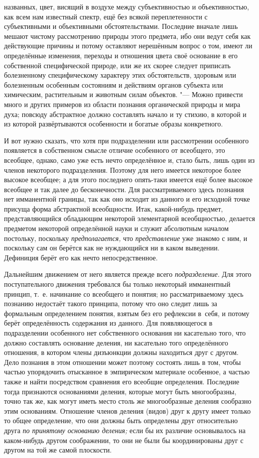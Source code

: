 названных, цвет, висящий в воздухе между субъективностью и объективностью,
как всем нам известный спектр, ещё без всякой переплетенности с
субъективными и объективными обстоятельствами. Последние вначале лишь
мешают чистому рассмотрению природы этого предмета, ибо они ведут себя как
действующие причины и потому оставляют нерешённым вопрос о том, имеют ли
определённые изменения, переходы и отношения цвета своё основание в его
собственной специфической природе, или же их скорее следует приписать
болезненному специфическому характеру этих обстоятельств, здоровым или
болезненным особенным состояниям и действиям органов субъекта или
химическим, растительным и животным силам объектов. "--- Можно
привести много и других примеров из области познания органической природы и
мира духа; повсюду абстрактное должно составлять начало и ту стихию, в
которой и из которой развёртываются особенности и богатые образы
конкретного.

И вот нужно сказать, что хотя при подразделении или
рассмотрении особенного появляется в собственном смысле отличие особенного
от всеобщего, это всеобщее, однако, само уже есть нечто определённое и,
стало быть, лишь один из членов некоторого подразделения. Поэтому для него
имеется некоторое более высокое всеобщее; а для этого последнего опять-таки
имеется ещё более высокое всеобщее и так далее до
бесконечности. Для рассматриваемого здесь познания нет имманентной границы,
так как оно исходит из данного и его исходной точке присуща форма
абстрактной всеобщности. Итак, какой-нибудь предмет, представляющийся
обладающим некоторой элементарной всеобщностью, делается предметом
некоторой определённой науки и служит абсолютным началом постольку,
поскольку {\em предполагается,}
что {\em представление}
уже знакомо с ним, и поскольку сам он берётся как не
нуждающийся ни в каком выведении. Дефиниция берёт его как нечто
непосредственное.

Дальнейшим движением от него является прежде всего
{\em подразделение}. Для
этого поступательного движения требовался бы только некоторый имманентный
принцип, т.~е. начинание со всеобщего и понятия; но рассматриваемому здесь
познанию недостаёт такого принципа, потому что оно следит лишь за
формальным определением понятия, взятым без его рефлексии в~себя, и потому
берёт определённость содержания из данного. Для появляющегося в
подразделении особенного нет собственного основания ни касательно того, что
должно составлять основание деления, ни касательно того определённого
отношения, в котором члены дизъюнкции должны находиться друг с другом. Дело
познания в этом отношении может поэтому состоять лишь в том, чтобы частью
упорядочить отысканное в эмпирическом материале особенное, а частью также и
найти посредством сравнения его всеобщие определения. Последние тогда
признаются основаниями деления, которые могут быть многообразны, точно так
же, как могут иметь место столь же многообразные деления сообразно этим
основаниям. Отношение членов деления (видов) друг к другу имеет только то
общее определение, что они должны быть определены друг относительно друга
{\em по принятому основанию деления;} если бы их различие основывалось на
каком-нибудь другом соображении, то они не были бы координированы друг
с другом на той же самой плоскости.

